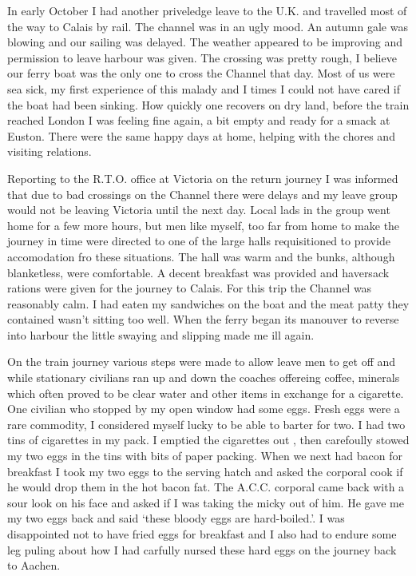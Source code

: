 In early October I had another priveledge leave to the U.K. and
travelled most of the way to Calais by rail. The channel was in an
ugly mood. An autumn gale was blowing and our sailing was delayed. The
weather appeared to be improving and permission to leave harbour was
given. The crossing was pretty rough, I believe our ferry boat was the
only one to cross the Channel that day. Most of us were sea sick, my
first experience of this malady and I times I could not have cared if
the boat had been sinking. How quickly one recovers on dry land,
before the train reached London I was feeling fine again, a bit empty
and ready for a smack at Euston. There were the same happy days at
home, helping with the chores and visiting relations.

Reporting to the R.T.O. office at Victoria on the return journey I was
informed that due to bad crossings on the Channel there were delays
and my leave group would not be leaving Victoria until the next
day. Local lads in the group went home for a few more hours, but men
like myself, too far from home to make the journey in time were
directed to one of the large halls requisitioned to provide
accomodation fro these situations. The hall was warm and the bunks,
although blanketless, were comfortable. A decent breakfast was
provided and haversack rations were given for the journey to
Calais. For this trip the Channel was reasonably calm. I had eaten my
sandwiches on the boat and the meat patty they contained wasn't
sitting too well. When the ferry began its manouver to reverse into
harbour the little swaying and slipping made me ill again.

On the train journey various steps were made to allow leave men to get
off and while stationary civilians ran up and down the coaches
offereing coffee, minerals which often proved to be clear water and
other items in exchange for a cigarette. One civilian who stopped by
my open window had some eggs. Fresh eggs were a rare commodity, I
considered myself lucky to be able to barter for two. I had two tins
of cigarettes in my pack. I emptied the cigarettes out , then
carefoully stowed my two eggs in the tins with bits of paper
packing. When we next had bacon for breakfast I took my two eggs to
the serving hatch and asked the corporal cook if he would drop them in
the hot bacon fat. The A.C.C. corporal came back with a sour look on
his face and asked if I was taking the micky out of him. He gave me my
two eggs back and said `these bloody eggs are hard-boiled.'. I was
disappointed not to have fried eggs for breakfast and I also had to
endure some leg puling about how I had carfully nursed these hard eggs
on the journey back to Aachen.

